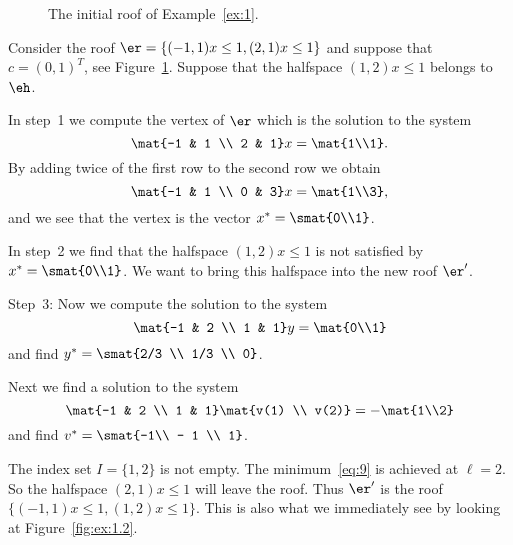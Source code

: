  \begin{figure}[htbp]
    \begin{center}
      \caption{The initial roof  of Example~\ref{ex:1}.}
        \label{fig:ex:1.1}
    \end{center}    
  \end{figure}


\begin{example}
  \label{ex:1}
    
  Consider the roof $\er = \{(-1,1) x \leq 1, (2,1)x\leq1\}$ and suppose
  that $c = (0,1)^T$, see Figure~\ref{fig:ex:1.1}. Suppose that the
  halfspace $(1,2)x\leq1$ belongs to $\eh$. 
  
  \noindent 
  In step~1 we compute the vertex of $\er$ which is the solution to the
  system 
  \begin{equation}
    \label{eq:19}
    \mat{-1 & 1 \\ 2 & 1}  x  = \mat{1\\1}.
  \end{equation}
  By adding twice of the first row to the second row we obtain 
  \begin{equation}
    \label{eq:6}
     \mat{-1 & 1 \\ 0 & 3}  x  = \mat{1\\3},
  \end{equation}
  and we see that 
  the  vertex is the vector $x^* = \smat{0\\1}$.  
  
  \noindent 
  In step~2 we find that the halfspace $(1,2) x \leq1$ is not satisfied
  by $x^* = \smat{0\\1}$. We want to bring this halfspace into the new
  roof $\er'$.
  
  \noindent 
  Step~3:
  Now we compute the solution  to the system 
  \begin{equation}
    \label{eq:20}
    \mat{-1 & 2 \\ 1 & 1} y = \mat{0\\1}
  \end{equation}
  and  find $y^* = \smat{2/3 \\ 1/3 \\ 0}$.  
  
  Next we find a solution  to the system 
   \begin{equation}
     \label{eq:21}
    \mat{-1 & 2 \\ 1 & 1} \mat{v(1) \\ v(2)} = - \mat{1\\2}
  \end{equation} 
  and find  $v^* = \smat{-1\\ - 1 \\ 1}$. 
  
  \noindent
  The index set $I = \{1,2\}$ is not empty. The minimum~\eqref{eq:9} is
  achieved at  $\ell =2$. So the halfspace 
  $(2,1)x\leq1$ will leave the roof. Thus $\er'$ is
  the roof $\{(-1,1)x \leq 1,
  (1,2)x\leq1\}$.  This is also what we immediately see by
  looking at Figure~\ref{fig:ex:1.2}. 
   
\end{example}

